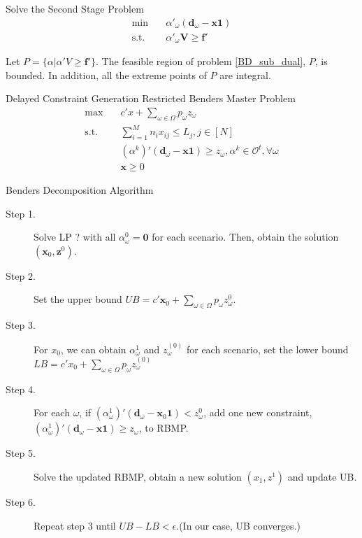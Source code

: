 \begin{frame}{Solve the Second Stage Problem}
  \begin{equation}\label{BD_sub_dual}
    \begin{aligned}
      \min \quad & \alpha{'}_{\omega} (\mathbf{d}_{\omega}- \mathbf{x} \mathbf{1}) \\
      \text {s.t.} \quad & \alpha{'}_{\omega} \mathbf{V} \geq \mathbf{f}{'}
    \end{aligned}
    \end{equation}

    Let $P = \{\alpha|\alpha{'}V \geq \mathbf{f}{'}\}$. 
    The feasible region of problem \eqref{BD_sub_dual}, $P$, is bounded. In addition, all the extreme points of $P$ are integral.
\end{frame}

\begin{frame}{Delayed Constraint Generation}
  Restricted Benders Master Problem
  \begin{equation}\label{BD_master2}
    \begin{aligned}
      \max \quad & c{'} x + \sum_{\omega \in \Omega} p_{\omega} z_{\omega} \\
      \text {s.t.} \quad & \sum_{i=1}^{M} n_{i} x_{ij} \leq L_j, j \in [N] \\
      & (\alpha^{k}){'}(\mathbf{d}_{\omega}- \mathbf{x} \mathbf{1}) \geq z_{\omega}, \alpha^k \in \mathcal{O}^{t}, \forall \omega \\
       & \mathbf{x} \geq 0
    \end{aligned}
  \end{equation} 
\end{frame}

\begin{frame}{Benders Decomposition Algorithm}
  \begin{description}
    \item[Step 1.] Solve LP ? with all $\alpha_{\omega}^0 = \mathbf{0}$ for each scenario.
    Then, obtain the solution $(\mathbf{x}_0, \mathbf{z}^{0})$.

    \item[Step 2.] Set the upper bound $UB = c{'} \mathbf{x}_0 + \sum_{\omega \in \Omega} p_{\omega} z_{\omega}^{0}$.
    \item[Step 3.] 
    For $x_0$, we can obtain $\alpha_{\omega}^{1}$ and $z_{\omega}^{(0)}$ for each scenario, set the lower bound $LB = c{'} x_0 + \sum_{\omega \in \Omega} p_{\omega} z_{\omega}^{(0)}$
    \item[Step 4.]
    For each $\omega$, if $(\alpha_{\omega}^{1}){'}(\mathbf{d}_{\omega}- \mathbf{x}_0 \mathbf{1}) < z_{\omega}^{0}$, add one new constraint, $(\alpha_{\omega}^{1}){'}(\mathbf{d}_{\omega}- \mathbf{x} \mathbf{1}) \geq z_{\omega}$, to RBMP.
    \item[Step 5.] Solve the updated RBMP, obtain a new solution $(x_1, z^{1})$ and update UB.
    \item[Step 6.] Repeat step 3 until $UB - LB < \epsilon$.(In our case, UB converges.)
   \end{description}
\end{frame}

